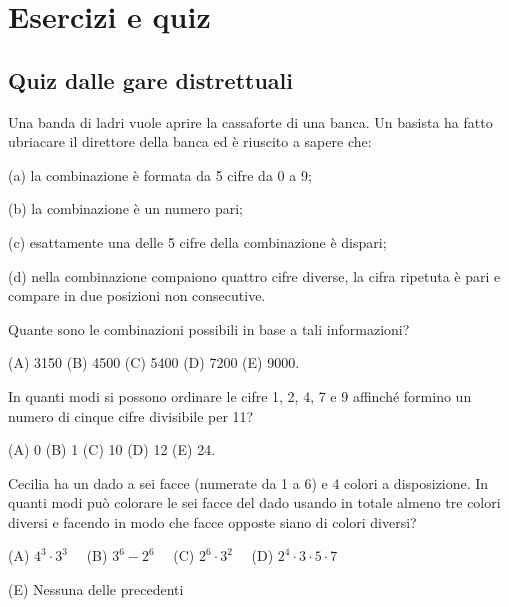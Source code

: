 \chapter{Esercizi e quiz}
\label{ch:quiz}


\section{Quiz dalle gare distrettuali}
\label{sec:quiz_gare_distrettuali}

\begin{esercizio}
    \label{ex:distrettuali_2008_1}
    Una banda di ladri vuole aprire la cassaforte di una banca.
    Un basista ha fatto ubriacare il direttore della banca ed è riuscito a sapere che:

    (a) la combinazione è formata da 5 cifre da 0 a 9;

    (b) la combinazione è un numero pari;

    (c) esattamente una delle 5 cifre della combinazione è dispari;

    (d) nella combinazione compaiono quattro cifre diverse, la cifra ripetuta è pari e compare in due posizioni non consecutive.

    Quante sono le combinazioni possibili in base a tali informazioni?

    (A) 3150 \quad (B) 4500 \quad (C) 5400 \quad (D) 7200 \quad (E) 9000.
\end{esercizio}

\begin{esercizio}
    \label{ex:distrettuali_2008_7}
    In quanti modi si possono ordinare le cifre 1, 2, 4, 7 e 9 affinché formino un numero di cinque cifre divisibile per 11?

    (A) 0 \quad (B) 1 \quad (C) 10 \quad (D) 12 \quad (E) 24.
\end{esercizio}

\begin{esercizio}
    \label{ex:distrettuali_2016_5}
    Cecilia ha un dado a sei facce (numerate da 1 a 6) e 4 colori a disposizione.
    In quanti modi può colorare le sei facce del dado usando in totale almeno tre colori diversi e facendo in modo che
    facce opposte siano di colori diversi?

    (A) $4^3 \cdot 3^3 \quad$ (B) $3^6 - 2^6 \quad$ (C) $2^6 \cdot 3^2 \quad$ (D) $2^4 \cdot 3 \cdot 5 \cdot 7 \quad$

    (E) Nessuna delle precedenti
\end{esercizio}

